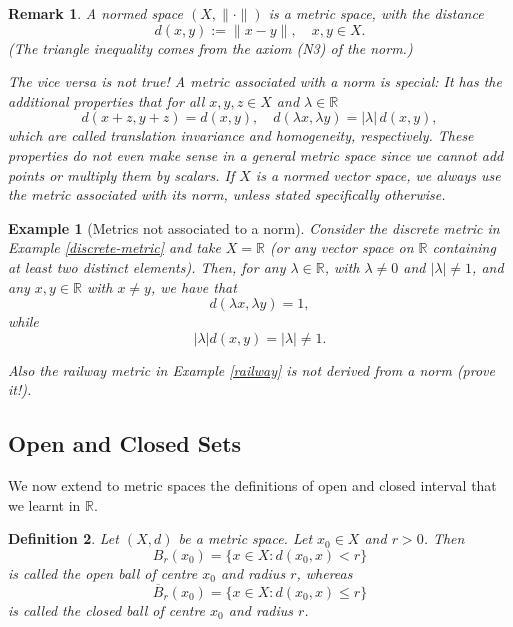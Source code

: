 \documentclass[a4paper,reqno]{amsart}
\numberwithin{equation}{section}
\newtheorem{definition}{Definition}[section]
\newtheorem{remark}[definition]{Remark}
\newtheorem{example}{Example}
\def\R{\mathbb{R}}
\begin{document}
\begin{remark}
A normed space $(X,\|\cdot\|)$ is a metric space, with the distance
$$
d(x,y):= \|x-y\|, \quad x,y\in X.
$$
(The triangle inequality comes from the axiom (N3) of the norm.)

\medskip

The vice versa is not true! A metric associated with a norm is special: It has the additional properties that for all $x, y, z \in X$ and $\lambda\in \R$
$$d(x + z,y + z) = d(x,y), \quad d(\lambda x,\lambda y) = |\lambda| \, d(x,y),$$
which are called translation invariance and homogeneity, respectively. These properties do not even make sense in a general metric space since we cannot add points or multiply them by scalars. If $X$ is a normed vector space, we always use the metric associated with its norm, unless stated specifically otherwise.
\end{remark}



\begin{example}[Metrics not associated to a norm]
Consider the discrete metric in Example \ref{discrete-metric} and take $X=\R$ (or any vector space on $\R$ containing at least two distinct elements). Then, for any $\lambda\in \R$, with $\lambda\neq 0$ and $|\lambda|\neq 1$, and any $x,y \in \R$ with $x\neq y$, we have that
$$
d(\lambda x, \lambda y) =1,
$$
while
$$
|\lambda| d(x,y) = |\lambda| \neq 1.
$$
\medskip

Also the railway metric in Example \ref{railway} is not derived from a norm (prove it!).

\end{example}

\subsection{Open and Closed Sets}

We now extend to metric spaces the definitions of open and closed interval that we learnt in $\R$.



\begin{definition} \label{def:ball}
Let $(X,d)$ be a metric space. Let $x_0 \in X$ and $r > 0$. Then
\[
B_r(x_0) = \{x \in X: d(x_0,x) < r\}
\]
is called the \emph{open ball} of centre $x_0$ and radius $r$, whereas
\[
\overline{B}_r(x_0) = \{x \in X: d(x_0,x) \leq r\}
\]
is called the \emph{closed ball} of centre $x_0$ and radius $r$.
\end{definition}
\end{document}
